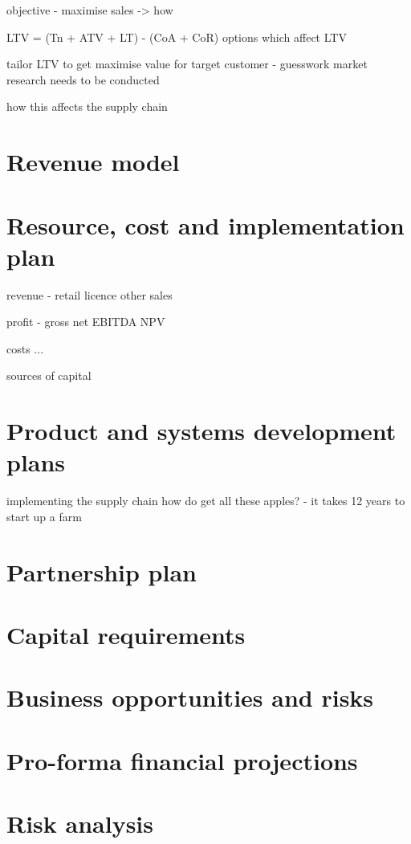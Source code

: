 \documentclass{article}
\begin{document}
objective - maximise sales -> how

LTV = (Tn + ATV + LT) - (CoA + CoR) 
options which affect LTV

tailor LTV to get maximise value for target customer - guesswork market research
needs to be conducted

how this affects the supply chain
\section{Revenue model}
\section{Resource, cost and implementation plan}
revenue
 - retail
   licence
   other sales

profit
 - gross
   net
   EBITDA
   NPV

costs
 ...

sources of capital
\section{Product and systems development plans}
implementing the supply chain
how do get all these apples? - it takes 12 years to start up a farm
\section{Partnership plan}
\section{Capital requirements}
\section{Business opportunities and risks}
\section{Pro-forma financial projections}
\section{Risk analysis}
\end{document}
